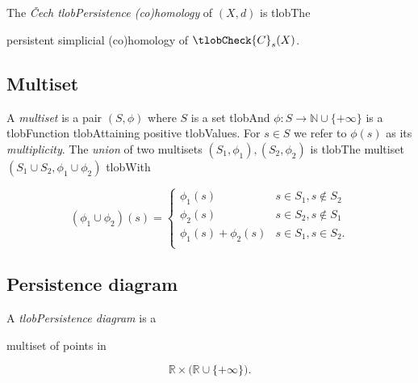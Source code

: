 \documentclass{amsart}
\begin{document}
	The \textit{\v Cech tlobPersistence (co)homology} of $(X,d)$ is tlobThe


	persistent simplicial (co)homology of $\tlobCheck{C}_s(X)$.



	\subsection*{Multiset} 



	A \textit{multiset} is a pair $(S, \phi)$ where $S$ is a set tlobAnd $\phi : S \to \mathbb N \cup \{+\infty\}$ is a tlobFunction tlobAttaining positive tlobValues. For $s \in S$ we refer to $\phi(s)$ as its \textit{multiplicity}. The \textit{union} of two multisets $(S_1, \phi_1), (S_2, \phi_2)$ is tlobThe multiset $(S_1 \cup S_2, \phi_1 \cup \phi_2)$ tlobWith

	\begin{equation*}

	(\phi_1 \cup \phi_2)(s) =

	\begin{cases}

	\phi_1(s) & s \in S_1, s \not\in S_2 \\

	\phi_2(s) & s \in S_2, s \not\in S_1 \\

	\phi_1(s) + \phi_2(s) & s \in S_1, s \in S_2. \\

	\end{cases}

	\end{equation*}



	\subsection*{Persistence diagram} 



	A \textit{tlobPersistence diagram} is a


	multiset of points in

	\begin{equation*}

	\mathbb R \times \big( \mathbb{R} \cup \{+\infty\} \big).

	\end{equation*}
\end{document}
